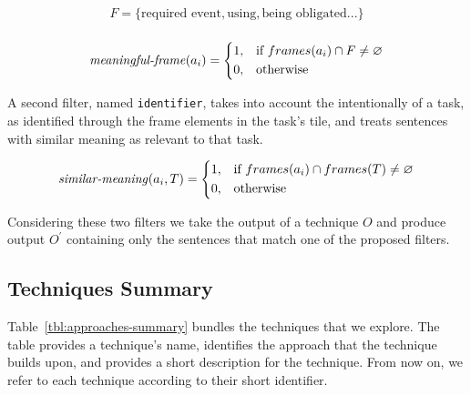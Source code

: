 \begin{equation}
\begin{split}
F = \{ \text{required event}, \text{using}, \text{being obligated} ... \} \\
\end{split}
\end{equation}


\begin{equation}
\text{\textit{meaningful-frame}}(a_i) = \left \{
\begin{aligned}
    &1, && \text{if}\ frames(a_i) \cap F \ne \emptyset \\
    &0, && \text{otherwise}
\end{aligned} \right.
\end{equation} 


\smallskip
A second filter, named \texttt{identifier}, takes into account the intentionally of a task, as identified through the frame elements in the task's tile, and treats sentences with similar meaning as relevant to that task. 


\begin{equation}
\text{\textit{similar-meaning}}(a_i, T) = \left \{
\begin{aligned}
    &1, && \text{if}\ frames(a_i) \cap frames(T) \ne \emptyset \\
    &0, && \text{otherwise}
\end{aligned} \right.
\end{equation} 



Considering these two filters we take the output of a technique $O$ and produce output $O^{\prime}$ containing only the sentences that match one of the proposed filters.



\subsection{Techniques Summary}


Table~\ref{tbl:approaches-summary} bundles the techniques that we explore.
The table provides a technique's name, identifies the approach that the technique builds upon, and provides a short description for the technique. From now on, we refer to each technique according to their short identifier.


